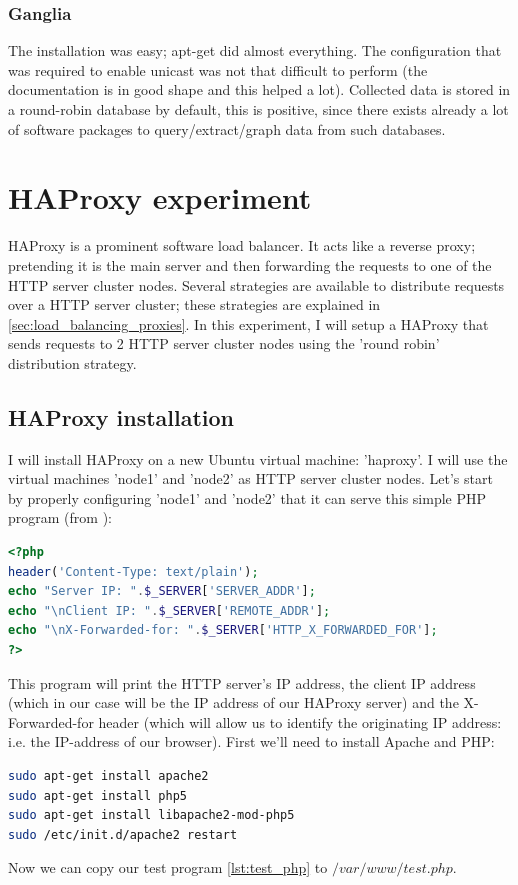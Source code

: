 \documentclass[12pt]{report}
\begin{document}
\subsubsection{Ganglia}
The installation was easy; apt-get did almost everything. The
configuration that was required to enable unicast was not that
difficult to perform (the documentation is in good shape and this helped a lot).
Collected data is stored in a round-robin database by default, this is
positive, since there exists already a lot of software packages
to query/extract/graph data from such databases.

\section{HAProxy experiment}
\label{ha_proxy_experiment}
HAProxy is a prominent software load balancer. It acts like a reverse
proxy; pretending it is the main server and then forwarding the
requests to one of the HTTP server cluster nodes.
Several strategies are available to distribute requests over a HTTP
server cluster; these strategies are explained in
\cref{sec:load_balancing_proxies}.
In this experiment, I will setup a HAProxy that sends requests to 2
HTTP server cluster nodes using the 'round robin' distribution
strategy.
\subsection{HAProxy installation}
I will install HAProxy on a new Ubuntu virtual machine: 'haproxy'.
I will use the virtual machines 'node1' and 'node2' as HTTP server cluster nodes.
Let's start by properly configuring 'node1' and 'node2' that it can
serve this simple PHP program (from \cite{haproxy_install_tutorial}):
\label{lst:test_php}
\begin{lstlisting}[language=php]
<?php
header('Content-Type: text/plain');
echo "Server IP: ".$_SERVER['SERVER_ADDR'];
echo "\nClient IP: ".$_SERVER['REMOTE_ADDR'];
echo "\nX-Forwarded-for: ".$_SERVER['HTTP_X_FORWARDED_FOR'];
?>
\end{lstlisting} 
This program will print the HTTP server's IP address, the client IP
address (which in our case will be the IP address of our HAProxy
server) and the X-Forwarded-for header (which will allow us to identify
the originating IP address: i.e. the IP-address of our browser).
First we'll need to install Apache and PHP:
\begin{lstlisting}[language=bash]
sudo apt-get install apache2
sudo apt-get install php5
sudo apt-get install libapache2-mod-php5
sudo /etc/init.d/apache2 restart
\end{lstlisting} 
Now we can copy our test program \cref{lst:test_php} to
$/var/www/test.php$.
\end{document}
